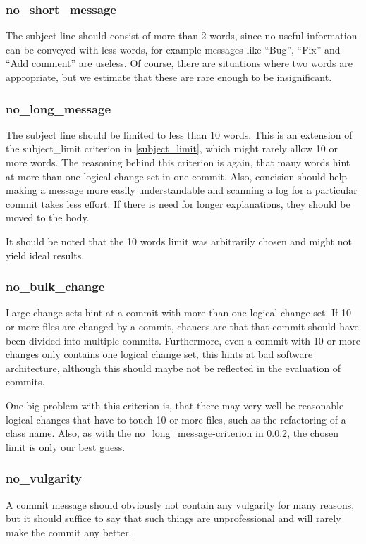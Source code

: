 \subsubsection{no\_short\_message}
\label{subs:no_short_message}
The subject line should consist of more than 2 words, since no useful information can be conveyed with less words, for example messages like ``Bug'', ``Fix'' and ``Add comment'' are useless. Of course, there are situations where two words are appropriate, but we estimate that these are rare enough to be insignificant.

\subsubsection{no\_long\_message}
\label{subs:no_long_message}
The subject line should be limited to less than 10 words. This is an extension of the subject\_limit criterion in \ref{subject_limit}, which might rarely allow 10 or more words. The reasoning behind this criterion is again, that many words hint at more than one logical change set in one commit. Also, concision should help making a message more easily understandable and scanning a log for a particular commit takes less effort. If there is need for longer explanations, they should be moved to the body.

It should be noted that the 10 words limit was arbitrarily chosen and might not yield ideal results.

\subsubsection{no\_bulk\_change}
\label{subs:no_bulk_change}
Large change sets hint at a commit with more than one logical change set. If 10 or more files are changed by a commit, chances are that that commit should have been divided into multiple commits. Furthermore, even a commit with 10 or more changes only contains one logical change set, this hints at bad software architecture, although this should maybe not be reflected in the evaluation of commits.

One big problem with this criterion is, that there may very well be reasonable logical changes that have to touch 10 or more files, such as the refactoring of a class name. Also, as with the no\_long\_message-criterion in \ref{subs:no_long_message}, the chosen limit is only our best guess.

\subsubsection{no\_vulgarity}
\label{subs:no_vulgarity}
A commit message should obviously not contain any vulgarity for many reasons, but it should suffice to say that such things are unprofessional and will rarely make the commit any better.

